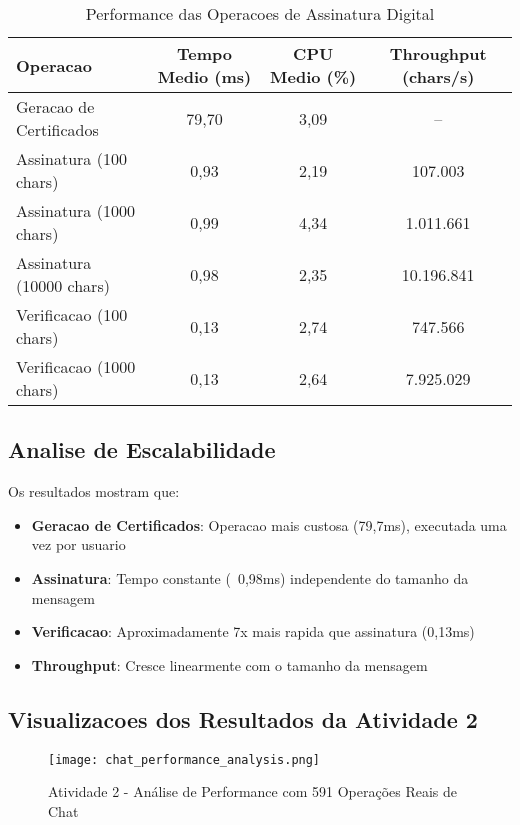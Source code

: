 \documentclass[12pt,a4paper,oneside]{article}
\begin{document}
\begin{table}[H]
\centering
\caption{Performance das Operacoes de Assinatura Digital}
\label{tab:signature_performance}
\begin{tabular}{lccc}
\toprule
\textbf{Operacao} & \textbf{Tempo Medio (ms)} & \textbf{CPU Medio (\%)} & \textbf{Throughput (chars/s)} \\
\midrule
Geracao de Certificados & 79,70 & 3,09 & -- \\
Assinatura (100 chars) & 0,93 & 2,19 & 107.003 \\
Assinatura (1000 chars) & 0,99 & 4,34 & 1.011.661 \\
Assinatura (10000 chars) & 0,98 & 2,35 & 10.196.841 \\
Verificacao (100 chars) & 0,13 & 2,74 & 747.566 \\
Verificacao (1000 chars) & 0,13 & 2,64 & 7.925.029 \\
\bottomrule
\end{tabular}
\end{table}

\subsection{Analise de Escalabilidade}

Os resultados mostram que:

\begin{itemize}
    \item \textbf{Geracao de Certificados}: Operacao mais custosa (79,7ms), executada uma vez por usuario
    \item \textbf{Assinatura}: Tempo constante (~0,98ms) independente do tamanho da mensagem
    \item \textbf{Verificacao}: Aproximadamente 7x mais rapida que assinatura (0,13ms)
    \item \textbf{Throughput}: Cresce linearmente com o tamanho da mensagem
\end{itemize}

\subsection{Visualizacoes dos Resultados da Atividade 2}

\begin{figure}[H]
\centering
\texttt{[image: chat\_performance\_analysis.png]}
\caption{Atividade 2 - Análise de Performance com 591 Operações Reais de Chat}
\label{fig:atividade2_performance_final}
\end{figure}
\end{document}
